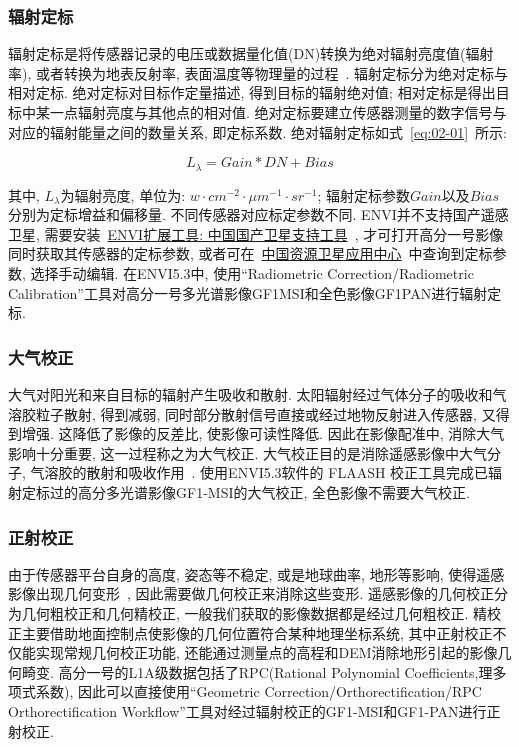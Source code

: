 \subsubsection*{辐射定标}
辐射定标是将传感器记录的电压或数据量化值(DN)转换为绝对辐射亮度值(辐射率), 或者转换为地表反射率, 表面温度等物理量的过程~\cite{RSbook01}. 辐射定标分为绝对定标与相对定标. 绝对定标对目标作定量描述, 得到目标的辐射绝对值; 相对定标是得出目标中某一点辐射亮度与其他点的相对值. 绝对定标要建立传感器测量的数字信号与对应的辐射能量之间的数量关系, 即定标系数. 绝对辐射定标如式~\ref{eq:02-01}~所示:

\begin{equation}
    L_{\lambda}=Gain * DN + Bias
    \label{eq:02-01}
\end{equation}

其中, $L_{\lambda}$为辐射亮度, 单位为: $w \cdot cm^{-2} \cdot \mu m^{-1} \cdot sr^{-1} $; 辐射定标参数$Gain$以及$Bias$分别为定标增益和偏移量. 不同传感器对应标定参数不同. ENVI并不支持国产遥感卫星\label{sec:this}, 需要安装~\href{http://blog.sina.com.cn/s/blog_764b1e9d0102xjbj.html#cmt_5AD807AE-3B2A6BFD-6A4E9A6B-91B-8EF}{ENVI扩展工具: 中国国产卫星支持工具}~, 才可打开高分一号影像同时获取其传感器的定标参数, 或者可在~\href{http://www.cresda.com/CN/Downloads/dbcs/index.shtml}{中国资源卫星应用中心}~中查询到定标参数, 选择手动编辑. 在ENVI5.3中, 使用``Radiometric Correction/Radiometric Calibration''工具对高分一号多光谱影像GF1MSI和全色影像GF1PAN进行辐射定标.

\subsubsection*{大气校正}
大气对阳光和来自目标的辐射产生吸收和散射. 太阳辐射经过气体分子的吸收和气溶胶粒子散射, 得到减弱, 同时部分散射信号直接或经过地物反射进入传感器, 又得到增强. 这降低了影像的反差比, 使影像可读性降低. 因此在影像配准中, 消除大气影响十分重要, 这一过程称之为大气校正. 大气校正目的是消除遥感影像中大气分子, 气溶胶的散射和吸收作用~\cite{RSbook01}. 使用ENVI5.3软件的 FLAASH 校正工具完成已辐射定标过的高分多光谱影像GF1-MSI的大气校正, 全色影像不需要大气校正.  

\subsubsection*{正射校正}
由于传感器平台自身的高度, 姿态等不稳定, 或是地球曲率, 地形等影响, 使得遥感影像出现几何变形~\cite{RSbook01}, 因此需要做几何校正来消除这些变形. 遥感影像的几何校正分为几何粗校正和几何精校正, 一般我们获取的影像数据都是经过几何粗校正. 精校正主要借助地面控制点使影像的几何位置符合某种地理坐标系统, 其中正射校正不仅能实现常规几何校正功能, 还能通过测量点的高程和DEM消除地形引起的影像几何畸变. 高分一号的L1A级数据包括了RPC(Rational Polynomial Coefficients,理多项式系数), 因此可以直接使用``Geometric Correction/Orthorectification/RPC Orthorectification Workflow''工具对经过辐射校正的GF1-MSI和GF1-PAN进行正射校正. 

